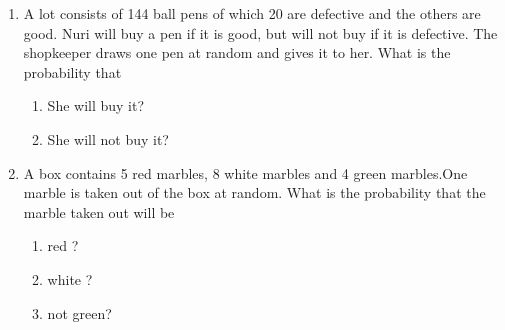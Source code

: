 \begin{enumerate}[label=\thechapter.\arabic*,ref=\thechapter.\theenumi]
	\item A lot consists of 144 ball pens of which 20 are defective and the 
    others are good. Nuri will buy a pen if it is good, but will not buy if it 
    is defective. The shopkeeper draws one pen at random and gives it to her. 
    What is the probability that
    \begin{enumerate}
        \item She will buy it?
        \item She will not buy it?
    \end{enumerate}
\solution

\item A box contains 5 red marbles, 8 white marbles and 4 green marbles.One marble is taken
out of the box at random. What is the probability that the marble taken out will be 
\\
\solution
\begin{enumerate}
    \item red ? 
    \item white ? 
    \item  not green?
\end{enumerate}



\end{enumerate}

